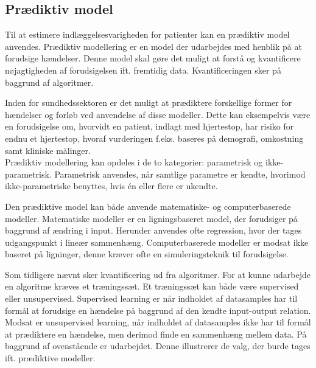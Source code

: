 \subsection{Prædiktiv model}
\noindent
Til at estimere indlæggelsesvarigheden for patienter kan en prædiktiv model anvendes. 
Prædiktiv modellering er en model der udarbejdes med henblik på at forudsige hændelser.  Denne model skal gøre det muligt at forstå og kvantificere nøjagtigheden af forudsigelsen ift. fremtidig data.\cite{Kuhn2013} Kvantificeringen sker på baggrund af algoritmer. 


Inden for sundhedssektoren er det muligt at prædiktere forskellige former for hændelser og forløb ved anvendelse af disse modeller. Dette kan eksempelvis være en forudsigelse om, hvorvidt en patient, indlagt med hjertestop, har risiko for endnu et hjertestop, hvoraf vurderingen f.eks. baseres på demografi, omkostning samt kliniske målinger\cite{Hastie2008}.  \\

\noindent
Prædiktiv modellering kan opdeles i de to kategorier: parametrisk og ikke-parametrisk. Parametrisk anvendes, når samtlige parametre er kendte, hvorimod ikke-parametriske benyttes, hvis én eller flere er ukendte.\cite{Sheskin2000} %


Den prædiktive model kan både anvende matematiske- og computerbaserede modeller. Matematiske modeller er en ligningsbaseret model, der forudsiger på baggrund af ændring i input. Herunder anvendes ofte regression, hvor der tages udgangspunkt i lineær sammenhæng. Computerbaserede modeller er modsat ikke baseret på ligninger, denne kræver ofte en simuleringsteknik til forudsigelse.\cite{MathWorks2016}


Som tidligere nævnt sker kvantificering ud fra algoritmer. For at kunne udarbejde en algoritme kræves et træningssæt\cite{DIKU2010}. Et træningssæt kan både være supervised eller unsupervised. Supervised learning er når indholdet af datasamples har til formål at forudsige en hændelse på baggrund af den kendte input-output relation\cite{Brownlee2013}. Modsat er unsupervised learning, når indholdet af datasamples ikke har til formål at prædiktere en hændelse, men derimod finde en sammenhæng mellem data\cite{Brownlee2013, Kuhn2013}. %
På baggrund af ovenstående er  udarbejdet. Denne illustrerer de valg, der burde tages ift. prædiktive modeller.

